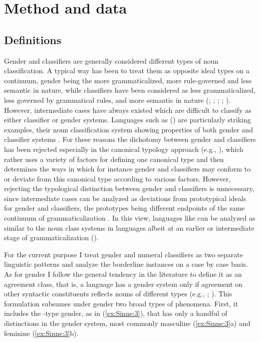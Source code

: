 \documentclass[output=collectionpaper]{langsci/langscibook}
\begin{document}
\section{Method and data}
\label{sec:Sinne:3}

\subsection{ Definitions}
\label{sec:Sinne:3.1}

Gender and classifiers are generally considered different types of noun classification. A typical way has been to treat them as opposite ideal types on a continuum, gender being the more grammaticalized, more rule-governed and less semantic in nature, while classifiers have been considered as less grammaticalized, less governed by grammatical rules, and more semantic in nature (\citealt{Dixon1982}; \citealt{Serzisko1982}; \citealt{Corbett1991}; \citealt{Aikhenvald2000}; \citealt{Passer2016b}). However, intermediate cases have always existed which are difficult to classify as either classifier or gender systems. Languages such as  () are particularly striking examples, their noun classification system showing properties of both gender and classifier systems \citep{Seifart2005}. For these reasons the dichotomy between gender and classifiers has been rejected especially in the canonical typology approach (e.g., \citealt{Corbett2016}), which rather uses a variety of factors for defining one canonical type and then determines the ways in which for instance gender and classifiers may conform to or deviate from this canonical type according to various factors. However, rejecting the typological distinction between gender and classifiers is unnecessary, since intermediate cases can be analyzed as deviations from prototypical ideals for gender and classifiers, the prototypes being different endpoints of the same continuum of grammaticalization \citep{Passer2016b}. In this view, languages like  can be analyzed as similar to the noun class systems in  languages albeit at an earlier or intermediate stage of grammaticalization (\citealt{Grinevald2004}).

For the current purpose I treat gender and numeral classifiers as two separate linguistic patterns and analyze the borderline instances on a case by case basis. As for gender I follow the general tendency in the literature to define it as an agreement class, that is, a language has a gender system only if agreement on other syntactic constituents reflects nouns of different types (e.g., \citealt[4--5]{Corbett1991}; \citealt[124--125]{Nichols1992}). This formulation subsumes under gender two broad types of phenomena. First, it includes the -type gender, as in (\ref{ex:Sinne:3}), that has only a handful of distinctions in the gender system, most commonly masculine (\ref{ex:Sinne:3}a) and feminine (\ref{ex:Sinne:3}b).
\end{document}
